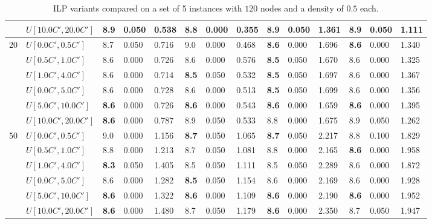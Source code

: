 \begin{table}[h]
{\begin{tabular}{|l|l||l|l|l||l|l|l||l|l|l||l|l|l|}
       & $U[10.0C',20.0C']$ & 8.9 & 0.050 & 0.538 & \textbf{8.8} & 0.000 & 0.355 & 8.9 & 0.050 & 1.361 & 8.9 & 0.050 & 1.111 \\
      \hline\hline
      \multirow{6}{*}{20} & $U[0.0C',0.5C']$ & 8.7 & 0.050 & 0.716 & 9.0 & 0.000 & 0.468 & \textbf{8.6} & 0.000 & 1.696 & \textbf{8.6} & 0.000 & 1.340 \\
       & $U[0.5C',1.0C']$ & 8.6 & 0.000 & 0.726 & 8.6 & 0.000 & 0.576 & \textbf{8.5} & 0.050 & 1.670 & 8.6 & 0.000 & 1.325 \\
       & $U[1.0C',4.0C']$ & 8.6 & 0.000 & 0.714 & \textbf{8.5} & 0.050 & 0.532 & \textbf{8.5} & 0.050 & 1.697 & 8.6 & 0.000 & 1.367 \\
       & $U[0.0C',5.0C']$ & 8.6 & 0.000 & 0.728 & 8.6 & 0.000 & 0.513 & \textbf{8.5} & 0.050 & 1.699 & 8.6 & 0.000 & 1.356 \\
       & $U[5.0C',10.0C']$ & \textbf{8.6} & 0.000 & 0.726 & \textbf{8.6} & 0.000 & 0.543 & \textbf{8.6} & 0.000 & 1.659 & \textbf{8.6} & 0.000 & 1.395 \\
       & $U[10.0C',20.0C']$ & \textbf{8.6} & 0.000 & 0.787 & 8.9 & 0.050 & 0.533 & 8.8 & 0.000 & 1.675 & 8.9 & 0.050 & 1.262 \\
      \hline\hline
      \multirow{6}{*}{50} & $U[0.0C',0.5C']$ & 9.0 & 0.000 & 1.156 & \textbf{8.7} & 0.050 & 1.065 & \textbf{8.7} & 0.050 & 2.217 & 8.8 & 0.100 & 1.829 \\
       & $U[0.5C',1.0C']$ & 8.8 & 0.000 & 1.213 & 8.7 & 0.050 & 1.081 & 8.8 & 0.000 & 2.165 & \textbf{8.6} & 0.000 & 1.958 \\
       & $U[1.0C',4.0C']$ & \textbf{8.3} & 0.050 & 1.405 & 8.5 & 0.050 & 1.111 & 8.5 & 0.050 & 2.289 & 8.6 & 0.000 & 1.872 \\
       & $U[0.0C',5.0C']$ & 8.6 & 0.000 & 1.282 & \textbf{8.5} & 0.050 & 1.154 & 8.6 & 0.000 & 2.169 & 8.6 & 0.000 & 1.928 \\
       & $U[5.0C',10.0C']$ & \textbf{8.6} & 0.000 & 1.322 & \textbf{8.6} & 0.000 & 1.109 & \textbf{8.6} & 0.000 & 2.190 & \textbf{8.6} & 0.000 & 1.952 \\
       & $U[10.0C',20.0C']$ & \textbf{8.6} & 0.000 & 1.480 & 8.7 & 0.050 & 1.179 & \textbf{8.6} & 0.000 & 2.350 & 8.7 & 0.050 & 1.947 \\
      \hline
      \end{tabular}
      }
      \caption{ILP variants compared on a set of 5 instances with $120$ nodes and a density of $0.5$ each.}
      \label{tab:pcpn120ILPVariant}\end{table}

